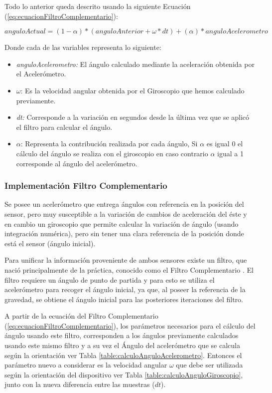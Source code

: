 \documentclass[12pt,a4paper]{article}
\begin{document}
Todo lo anterior queda descrito usando la siguiente Ecuación (\ref{eq:ecuacionFiltroComplementario}):

\begin{equation}
\label{eq:ecuacionFiltroComplementario}
anguloActual = (1-\alpha)*(anguloAnterior+\omega*dt)+(\alpha)*anguloAcelerometro
\end{equation}

Donde cada de las variables representa lo siguiente:
\begin{itemize}
	\item \textit{anguloAcelerometro:} El ángulo calculado mediante la aceleración obtenida por el Acelerómetro.
	\item $\omega$: Es la velocidad angular obtenida por el Giroscopio que hemos calculado previamente.
	\item \textit{dt:} Corresponde a la variación en segundos desde la última vez que se aplicó el filtro para calcular el ángulo.
	\item $\alpha$: Representa la contribución realizada por cada ángulo, Si $\alpha$ es igual 0 el cálculo del ángulo se realiza con el giroscopio en caso contrario $\alpha$ igual a 1 corresponde al ángulo del acelerómetro.
\end{itemize}

\subsubsection{Implementación Filtro Complementario}
Se posee un acelerómetro que entrega ángulos con referencia en la posición del sensor, pero muy susceptible a la variación de cambios de aceleración del éste y en cambio un giroscopio que permite calcular la variación de ángulo (usando integración numérica), pero sin tener una clara referencia de la posición donde está el sensor (ángulo inicial).

Para unificar la información proveniente de ambos sensores existe un filtro, que nació principalmente de la práctica, conocido como el Filtro Complementario \cite{TesisUSM}.
El filtro requiere un ángulo de punto de partida y para esto se utiliza el acelerómetro para recoger el ángulo inicial, ya que, al poseer la referencia de la gravedad, se obtiene el ángulo inicial para las posteriores iteraciones del filtro.


A partir de la ecuación del Filtro Complementario (\ref{eq:ecuacionFiltroComplementario}), los parámetros necesarios para el cálculo del ángulo usando este filtro, corresponden a los ángulos previamente calculados usando este mismo filtro y a su vez el Ángulo del acelerómetro que se calcula según la orientación ver Tabla \ref{table:calculoAnguloAcelerometro}.
Entonces el parámetro nuevo a considerar es la velocidad angular $\omega$ que debe ser utilizada según la orientación del dispositivo ver Tabla \ref{table:calculoAnguloGiroscopio}, junto con la nueva diferencia entre las muestras ($dt$).
\end{document}
